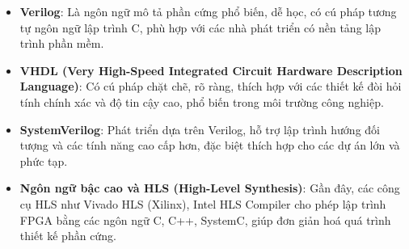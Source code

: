 \documentclass[a4paper]{article}
\begin{document}
\begin{itemize} [label=-]
    \item \textbf{Verilog}: Là ngôn ngữ mô tả phần cứng phổ biến, dễ học, có cú pháp tương tự ngôn ngữ lập trình C, phù hợp với các nhà phát triển có nền tảng lập trình phần mềm.
    \item \textbf{VHDL (Very High-Speed Integrated Circuit Hardware Description Language)}: Có cú pháp chặt chẽ, rõ ràng, thích hợp với các thiết kế đòi hỏi tính chính xác và độ tin cậy cao, phổ biến trong môi trường công nghiệp.
    \item \textbf{SystemVerilog}: Phát triển dựa trên Verilog, hỗ trợ lập trình hướng đối tượng và các tính năng cao cấp hơn, đặc biệt thích hợp cho các dự án lớn và phức tạp.
    \item \textbf{Ngôn ngữ bậc cao và HLS (High-Level Synthesis)}: Gần đây, các công cụ HLS như Vivado HLS (Xilinx), Intel HLS Compiler cho phép lập trình FPGA bằng các ngôn ngữ C, C++, SystemC, giúp đơn giản hoá quá trình thiết kế phần cứng.
\end{itemize}
\end{document}

